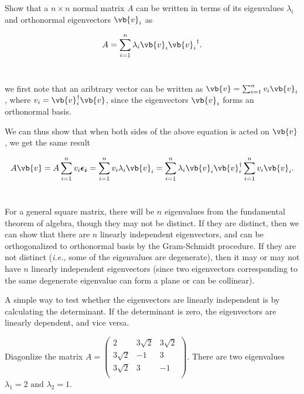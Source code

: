 \documentclass[a4paper,12pt]{report}
\begin{document}
{Show that a \(n \times n\) normal matrix \(A\) can be written in terms of its eigenvalues \(\lambda _{i} \) and orthonormal eigenvectors \(\vb{v}  _{i} \) as 

\begin{equation}
    A = \sum_{i=1}^{n} \lambda _{i} \vb{v}_{i}  {\vb{v}_{i}   }^{\dagger} .
\end{equation}~
}
{we first note that an aribtrary vector can be written as \(\vb{v} = \sum_{i=1}^{n} v_{i} \vb{v}_{i}  \), where \(v_{i} = \vb{v}_{i}^{\dagger} \vb{v}\), since the eigenvectors \(\vb{v}_{i}  \) forms an orthonormal basis.

We can thus show that when both sides of the above equation is acted on \(\vb{v} \), we get the same result 

\begin{equation}
    A\vb{v} = A\sum_{i=1}^{n} v_{i}\boldsymbol{\epsilon _{i} } = \sum_{i=1}^{n} v_{i} \lambda _{i} \vb{v}_{i} = \sum_{i=1}^{n} \lambda _{i} \vb{v}_{i}{\vb{v} }_{i} ^{\dagger}\sum_{i=1}^{n} v_{i} \vb{v}_{i}.   
\end{equation}~
} 

For a general square matrix, there will be \(n\) eigenvalues from the fundamental theorem of algebra, though they may not be distinct. If they are distinct, then we can show that there are \(n\) linearly independent eigenvectors, and can be orthogonalized to orthonormal basis by the Gram-Schmidt procedure. If they are not distinct (\textit{i.e.,} some of the eigenvalues are degenerate), then it may or may not have \(n\) linearly independent eigenvectors (since two eigenvectors corresponding to the same degenerate eigenvalue can form a plane or can be collinear).

A simple way to test whether the eigenvectors are linearly independent is by calculating the determinant. If the determinant is zero, the eigenvectors are linearly dependent, and vice versa.

{Diagonlize the matrix \(A = \begin{pmatrix}
    2 & 3\sqrt{2}  & 3\sqrt{2}   \\
    3\sqrt{2}  & -1 & 3  \\
    3\sqrt{2}  & 3 & -1  \\
\end{pmatrix}\). }
{There are two eigenvalues \(\lambda _{1} = 2 \text { and } \lambda _{2} =1 \).  } 
\end{document}
